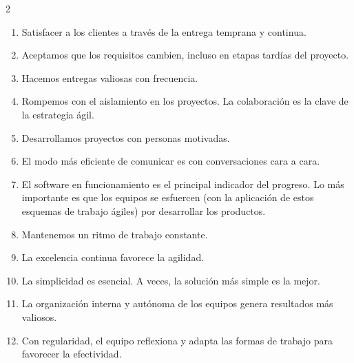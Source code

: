 \documentclass[10pt,a4paper]{article}
\begin{document}
\begin{multicols}{2}
\begin{enumerate}[leftmargin=*, noitemsep, topsep=0pt]
    \item Satisfacer a los clientes a través de la entrega temprana y continua.
    \item Aceptamos que los requisitos cambien, incluso en etapas tardías del proyecto.
    \item Hacemos entregas valiosas con frecuencia.
    \item Rompemos con el aislamiento en los proyectos. La colaboración es la clave de la estrategia ágil.
    \item Desarrollamos proyectos con personas motivadas.
    \item El modo más eficiente de comunicar es con conversaciones cara a cara.
    \item El software en funcionamiento es el principal indicador del progreso. Lo más importante es que los equipos se esfuercen (con la aplicación de estos esquemas de trabajo ágiles) por desarrollar los productos.
    \item Mantenemos un ritmo de trabajo constante.
    \item La excelencia continua favorece la agilidad.
    \item La simplicidad es esencial. A veces, la solución más simple es la mejor.
    \item La organización interna y autónoma de los equipos genera resultados más valiosos.
    \item Con regularidad, el equipo reflexiona y adapta las formas de trabajo para favorecer la efectividad.
\end{enumerate}

\end{multicols}
\end{document}
